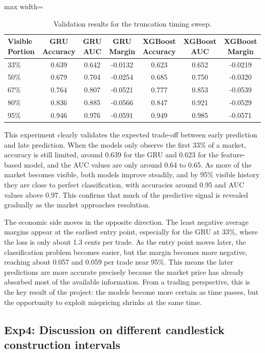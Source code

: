 \documentclass[11pt]{article}
\begin{document}
\begin{table}[ht!]
\centering
\caption{Validation results for the truncation timing sweep.}
\label{tab:ratio_sweep}
\small
\begin{adjustbox}{max width=\textwidth}
\begin{tabular}{@{}lcccccc@{}}
\toprule
Visible Portion & GRU Accuracy & GRU AUC & GRU Margin & XGBoost Accuracy & XGBoost AUC & XGBoost Margin \\
\midrule
33\% & 0.639 & 0.642 & -0.0132 & 0.623 & 0.652 & -0.0219 \\
50\% & 0.679 & 0.704 & -0.0254 & 0.685 & 0.750 & -0.0320 \\
67\% & 0.764 & 0.807 & -0.0521 & 0.777 & 0.853 & -0.0539 \\
80\% & 0.836 & 0.885 & -0.0566 & 0.847 & 0.921 & -0.0529 \\
95\% & 0.946 & 0.976 & -0.0591 & 0.949 & 0.985 & -0.0571 \\
\bottomrule
\end{tabular}
\end{adjustbox}
\end{table}

This experiment clearly validates the expected trade-off between early prediction and late prediction. When the models only observe the first 33\% of a market, accuracy is still limited, around 0.639 for the GRU and 0.623 for the feature-based model, and the AUC values are only around 0.64 to 0.65. As more of the market becomes visible, both models improve steadily, and by 95\% visible history they are close to perfect classification, with accuracies around 0.95 and AUC values above 0.97. This confirms that much of the predictive signal is revealed gradually as the market approaches resolution.

The economic side moves in the opposite direction. The least negative average margins appear at the earliest entry point, especially for the GRU at 33\%, where the loss is only about 1.3 cents per trade. As the entry point moves later, the classification problem becomes easier, but the margin becomes more negative, reaching about 0.057 and 0.059 per trade near 95\%. This means the later predictions are more accurate precisely because the market price has already absorbed most of the available information. From a trading perspective, this is the key result of the project: the models become more certain as time passes, but the opportunity to exploit mispricing shrinks at the same time.

\subsection{Exp4: Discussion on different candlestick construction intervals}
\end{document}
